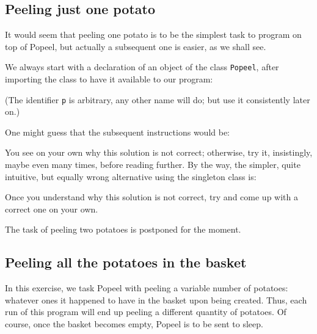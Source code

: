 \documentclass[12pt]{article}
\begin{document}
\subsection{Peeling just one potato}

It would seem that peeling one potato is to be
the simplest task to program on top of Popeel,
but actually a subsequent one is easier, as we
shall see.

We always start with a declaration of an object
of the class {\tt Popeel}, after importing the class
to have it available to our program:



(The identifier {\tt p} is arbitrary, any other
name will do; but use it consistently later on.)

One might guess that the subsequent instructions
would be:



You see on your own why this solution is not correct; 
otherwise, try it, insistingly, maybe even many times, 
before reading further. 
By the way, the simpler, quite intuitive, but equally wrong 
alternative using the singleton class is:




Once you understand why this solution is not
correct, try and come up with a correct one
on your own. 

The task of peeling two potatoes is postponed for the moment.

\subsection{Peeling all the potatoes in the basket}

In this exercise, we task Popeel with peeling a
variable number of potatoes: whatever ones it 
happened to have in the basket upon being created.
Thus, each run of this program will end up peeling a 
different quantity of potatoes. Of course, once the
basket becomes empty, Popeel is to be sent to sleep.
\end{document}
